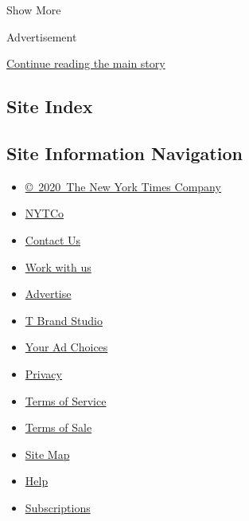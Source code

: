 Show More

Advertisement

\protect\hyperlink{after-mid2}{Continue reading the main story}

\hypertarget{site-index}{%
\subsection{Site Index}\label{site-index}}

\hypertarget{site-information-navigation}{%
\subsection{Site Information
Navigation}\label{site-information-navigation}}

\begin{itemize}
\tightlist
\item
  \href{https://help.nytimes3xbfgragh.onion/hc/en-us/articles/115014792127-Copyright-notice}{©~2020~The
  New York Times Company}
\end{itemize}

\begin{itemize}
\tightlist
\item
  \href{https://www.nytco.com/}{NYTCo}
\item
  \href{https://help.nytimes3xbfgragh.onion/hc/en-us/articles/115015385887-Contact-Us}{Contact
  Us}
\item
  \href{https://www.nytco.com/careers/}{Work with us}
\item
  \href{https://nytmediakit.com/}{Advertise}
\item
  \href{http://www.tbrandstudio.com/}{T Brand Studio}
\item
  \href{https://www.nytimes3xbfgragh.onion/privacy/cookie-policy\#how-do-i-manage-trackers}{Your
  Ad Choices}
\item
  \href{https://www.nytimes3xbfgragh.onion/privacy}{Privacy}
\item
  \href{https://help.nytimes3xbfgragh.onion/hc/en-us/articles/115014893428-Terms-of-service}{Terms
  of Service}
\item
  \href{https://help.nytimes3xbfgragh.onion/hc/en-us/articles/115014893968-Terms-of-sale}{Terms
  of Sale}
\item
  \href{https://spiderbites.nytimes3xbfgragh.onion}{Site Map}
\item
  \href{https://help.nytimes3xbfgragh.onion/hc/en-us}{Help}
\item
  \href{https://www.nytimes3xbfgragh.onion/subscription?campaignId=37WXW}{Subscriptions}
\end{itemize}
